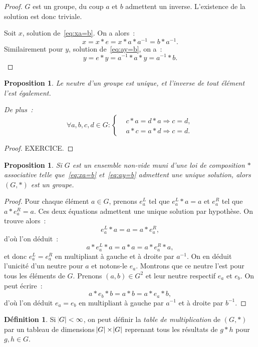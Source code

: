 \documentclass{article}
\newtheorem{prp}[thm]{Proposition}
\theoremstyle{definition}
\newtheorem{déf}[thm]{Définition}
\theoremstyle{remark}
\begin{document}
		\begin{proof} $G$ est un groupe, du coup $a$ et $b$ admettent un inverse. L'existence de la solution est donc triviale.

		Soit $x$, solution de~\eqref{eq:xa=b}. On a alors~:
		\[x = x*e = x*a*a^{-1} = b*a^{-1}.\]
		Similairement pour $y$, solution de~\eqref{eq:ay=b}, on a~:
		\[y = e*y = a^{-1}*a*y = a^{-1}*b.\]
		\end{proof}

		\begin{prp} Le neutre d'un groupe est unique, et l'inverse de tout élément l'est également.

		De plus~:
		\[\forall a, b, c, d \in G : \begin{cases}&c*a = d*a \Rightarrow c=d, \\&a*c=a*d \Rightarrow c=d.\end{cases}\]
		\end{prp}

		\begin{proof} EXERCICE. %
		\end{proof}

		\begin{prp} Si $G$ est un ensemble non-vide muni d'une loi de composition $*$ associative telle que~\eqref{eq:xa=b} et~\eqref{eq:ay=b} admettent une
		unique solution, alors $(G, *)$ est un groupe.
		\end{prp}

		\begin{proof} Pour chaque élément $a \in G$, prenons $e^L_a$ tel que $e^L_a*a = a$ et $e^R_a$ tel que $a*e^R_a = a$. Ces deux équations admettent une
		unique solution par hypothèse. On trouve alors~:
		\[e^L_a*a = a = a*e^R_a,\]
		d'où l'on déduit~:
		\[a*e^L_a*a = a*a=a*e^R_a*a,\]
		et donc $e^L_a = e^R_a$ en multipliant à gauche et à droite par $a^{-1}$. On en déduit l'unicité d'un neutre pour $a$ et notons-le $e_a$. Montrons que
		ce neutre l'est pour tous les éléments de $G$. Prenons $(a, b) \in G^2$ et leur neutre respectif $e_a$ et $e_b$. On peut écrire~:
		\[a*e_b*b = a*b = a*e_a*b,\]
		d'où l'on déduit $e_a = e_b$ en multipliant à gauche par $a^{-1}$ et à droite par $b^{-1}$.
		\end{proof}

		\begin{déf} Si $\abs G < \infty$, on peut définir la \textit{table de multiplication} de $(G, *)$ par un tableau de dimensions $\abs G \times \abs G$
		reprenant tous les résultats de $g*h$ pour $g, h \in G$.
		\end{déf}
\end{document}
